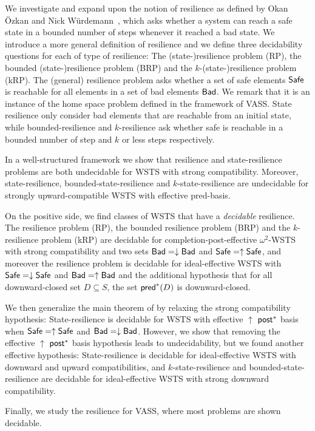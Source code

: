 

We investigate and expand upon the notion of resilience as defined by Okan Özkan and Nick Würdemann~\cite{DBLP:journals/corr/PrasadZ16,DBLP:journals/corr/abs-2108-00889,DBLP:conf/gg/Ozkan22}, which asks whether a system can reach a safe state in a bounded number of steps whenever it reached a bad state. We introduce a more general definition of resilience and we define three decidability questions for each of type of resilience: The (state-)resilience problem (RP), the bounded (state-)resilience problem (BRP)
and the $k$-(state-)resilience problem (kRP). The (general) resilience problem 
asks whether a set of safe elements $\textsf{Safe}$ is reachable for all elements in a set of bad elements $\textsf{Bad}$. 
We remark that it is an instance of the home space problem defined in the framework of VASS.
State resilience only consider bad elements that are reachable from an initial state, while bounded-resilience and $k$-resilience ask whether safe is reachable in a bounded number of step and $k$ or less steps respectively.

In a well-structured framework we show that resilience and state-resilience problems are both undecidable for WSTS with strong compatibility. Moreover, state-resilience,
bounded-state-resilience and
 $k$-state-resilience
are undecidable for strongly upward-compatible WSTS with effective pred-basis. 

On the positive side, we find classes of WSTS that have a \emph{decidable} resilience. The resilience problem (RP), the bounded resilience problem (BRP)
and the $k$-resilience problem (kRP) are decidable for completion-post-effective $\omega^2$-WSTS with strong compatibility and two sets $\textsf{Bad} = \downarrow \textsf{Bad}$ and $\textsf{Safe} = \uparrow \textsf{Safe}$, and moreover the resilience problem is decidable for ideal-effective WSTS with 
$\textsf{Safe}=\downarrow \textsf{Safe}$
and $\textsf{Bad}=\uparrow \textsf{Bad}$
and
the additional hypothesis that
for all downward-closed set $D \subseteq S$, the set $\textsf{pred}^*(D)$ is downward-closed.

We then generalize the main theorem of \cite{DBLP:journals/corr/abs-2108-00889,DBLP:conf/gg/Ozkan22} by relaxing the strong compatibility hypothesis: {\sc State-resilience} is decidable for 
 WSTS with effective 
$\uparrow$ $\textsf{post}^*$ basis
when
$\textsf{Safe}=\uparrow \textsf{Safe}$
and $\textsf{Bad}=\downarrow \textsf{Bad}$. However, we show that removing the effective 
$\uparrow$ $\textsf{post}^*$ basis hypothesis leads to undecidability, but we found another effective hypothesis: {\sc State-resilience} is decidable for ideal-effective WSTS with downward and upward compatibilities, and {\sc $k$-state-resilience} and {\sc bounded-state-resilience} are decidable for ideal-effective WSTS with strong downward compatibility.

Finally, we study the resilience for VASS, where most problems are shown decidable.






